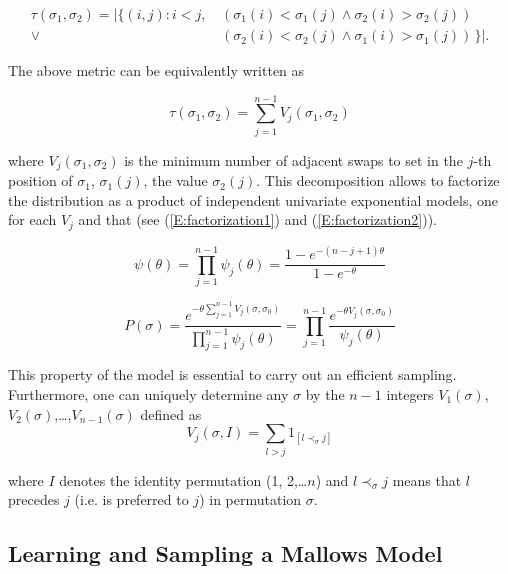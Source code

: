 \documentclass[runningheads]{llncs}
\begin{document}
\begin{align*}
\tau(\sigma_1, \sigma_2)=|\{(i,j) : i<j,\, & (\sigma_1(i) < \sigma_1(j) \land \sigma_2(i)>\sigma_2(j) ) \\ 
 \lor \,& (\sigma_2(i) < \sigma_2(j) \land \sigma_1(i)>\sigma_1(j) )  \, \}|.
\end{align*}

The above metric can be  equivalently written as 

\begin{equation}
\tau (\sigma_1, \sigma_2)=\sum_{j=1}^{n-1}V_j(\sigma_1, \sigma_2)
\end{equation}

\noindent
where $V_j(\sigma_1, \sigma_2)$ is the minimum number of adjacent swaps  to set in the $j$-th position of $\sigma_1$, $\sigma_1(j)$, the value $\sigma_2(j)$. This decomposition allows to factorize the distribution as a product of independent univariate exponential models\cite{meila2007-conrank}, one for each $V_j$ and that (see (\ref{E:factorization1}) and (\ref{E:factorization2})).

\begin{equation}
\psi(\theta) = \prod_{j=1}^{n-1}\psi_j(\theta) = \frac{1-e^{-(n-j+1)\theta}}{1-e^{-\theta}}
\label{E:factorization1}
\end{equation}

\begin{equation}
P(\sigma)= \frac{e^{-\theta \sum_{j=1}^{n-1}V_j(\sigma,\sigma_0)}}{\prod_{j=1}^{n-1}\psi_j(\theta)} = \prod_{j=1}^{n-1}\frac{e^{-\theta V_j(\sigma,\sigma_0)}}{\psi_j(\theta)}
\label{E:factorization2}
\end{equation}

This property of the model is essential to carry out an efficient sampling. Furthermore, one can uniquely determine any $\sigma$ by the $n-1$ integers $V_1(\sigma)$, $V_2(\sigma)$,\ldots,$V_{n-1}(\sigma)$ defined as 
\begin{equation}
V_j(\sigma,I)=\sum_{l>j}1_{[l\prec_{\sigma}j]}
\end{equation}

\noindent
where $I$ denotes the identity permutation (1, 2,\ldots$n$) and $l\prec_{\sigma}j$ means that $l$ precedes $j$ (i.e. is preferred to $j$) in permutation $\sigma$.

\subsection{Learning and Sampling a Mallows Model}
\end{document}
